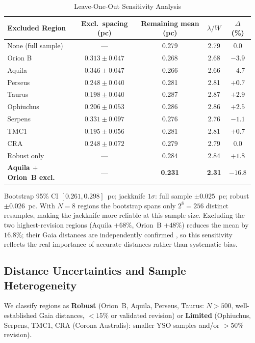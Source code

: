 \documentclass[twoside,twocolumn]{mnras}
\begin{document}
\begin{table}[h]
\caption{Leave-One-Out Sensitivity Analysis}
\label{tab:leave_one_out}
\begin{tabular}{lcccc}
\toprule
Excluded Region & Excl.\ spacing (pc) & Remaining mean (pc) & $\lambda/W$ & $\Delta$ (\%) \\
\midrule
None (full sample) & --- & 0.279 & 2.79 & 0.0 \\
Orion B & $0.313 \pm 0.047$ & 0.268 & 2.68 & $-3.9$ \\
Aquila & $0.346 \pm 0.047$ & 0.266 & 2.66 & $-4.7$ \\
Perseus & $0.248 \pm 0.040$ & 0.281 & 2.81 & $+0.7$ \\
Taurus & $0.198 \pm 0.040$ & 0.287 & 2.87 & $+2.9$ \\
Ophiuchus & $0.206 \pm 0.053$ & 0.286 & 2.86 & $+2.5$ \\
Serpens & $0.331 \pm 0.097$ & 0.276 & 2.76 & $-1.1$ \\
TMC1 & $0.195 \pm 0.056$ & 0.281 & 2.81 & $+0.7$ \\
CRA & $0.248 \pm 0.072$ & 0.279 & 2.79 & $0.0$ \\
\midrule
Robust only & --- & 0.284 & 2.84 & $+1.8$ \\
\textbf{Aquila $+$ Orion~B excl.} & --- & \textbf{0.231} & \textbf{2.31} & $\mathbf{-16.8}$ \\
\bottomrule
\end{tabular}
\vspace{2pt}
\footnotesize Bootstrap 95\% CI $[0.261, 0.298]$~pc; jackknife $1\sigma$: full sample $\pm 0.025$~pc; robust $\pm 0.026$~pc. With $N=8$ regions the bootstrap spans only $2^8=256$ distinct resamples, making the jackknife more reliable at this sample size. Excluding the two highest-revision regions (Aquila $+68\%$, Orion~B $+48\%$) reduces the mean by $16.8\%$; their Gaia distances are independently confirmed \citep{Yan2022,Green2024,Kounkel2018}, so this sensitivity reflects the real importance of accurate distances rather than systematic bias.
\end{table}

\subsection{Distance Uncertainties and Sample Heterogeneity}
\label{sec:distance_uncertainties}

We classify regions as \textbf{Robust} (Orion~B, Aquila, Perseus, Taurus: $N>500$,
well-established Gaia distances, $<15\%$ or validated revision) or \textbf{Limited}
(Ophiuchus, Serpens, TMC1, CRA (Corona Australis): smaller YSO samples and/or $>50\%$ revision).
\end{document}
